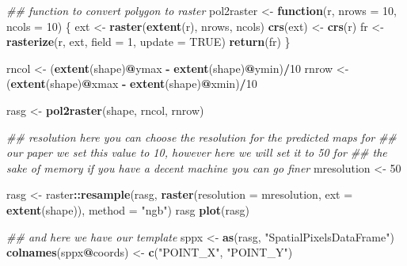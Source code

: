 \documentclass[]{book}
\newenvironment{Shaded}{\begin{snugshade}}{\end{snugshade}}
\newcommand{\CommentTok}[1]{\textcolor[rgb]{0.56,0.35,0.01}{\textit{#1}}}
\newcommand{\ControlFlowTok}[1]{\textcolor[rgb]{0.13,0.29,0.53}{\textbf{#1}}}
\newcommand{\DataTypeTok}[1]{\textcolor[rgb]{0.13,0.29,0.53}{#1}}
\newcommand{\DecValTok}[1]{\textcolor[rgb]{0.00,0.00,0.81}{#1}}
\newcommand{\KeywordTok}[1]{\textcolor[rgb]{0.13,0.29,0.53}{\textbf{#1}}}
\newcommand{\NormalTok}[1]{#1}
\newcommand{\OperatorTok}[1]{\textcolor[rgb]{0.81,0.36,0.00}{\textbf{#1}}}
\newcommand{\OtherTok}[1]{\textcolor[rgb]{0.56,0.35,0.01}{#1}}
\newcommand{\StringTok}[1]{\textcolor[rgb]{0.31,0.60,0.02}{#1}}
\begin{document}
\begin{Shaded}
\begin{Highlighting}[]
\CommentTok{## function to convert polygon to raster}
\NormalTok{pol2raster <-}\StringTok{ }\ControlFlowTok{function}\NormalTok{(r, }\DataTypeTok{nrows =} \DecValTok{10}\NormalTok{, }\DataTypeTok{ncols =} \DecValTok{10}\NormalTok{) \{}
\NormalTok{                    ext <-}\StringTok{ }\KeywordTok{raster}\NormalTok{(}\KeywordTok{extent}\NormalTok{(r), nrows, ncols)}
                    \KeywordTok{crs}\NormalTok{(ext) <-}\StringTok{ }\KeywordTok{crs}\NormalTok{(r)}
\NormalTok{                    fr <-}\StringTok{ }\KeywordTok{rasterize}\NormalTok{(r, ext, }\DataTypeTok{field =} \DecValTok{1}\NormalTok{, }\DataTypeTok{update =} \OtherTok{TRUE}\NormalTok{)}
                    \KeywordTok{return}\NormalTok{(fr)}
\NormalTok{\}}

\NormalTok{rncol <-}\StringTok{ }\NormalTok{(}\KeywordTok{extent}\NormalTok{(shape)}\OperatorTok{@}\NormalTok{ymax }\OperatorTok{-}\StringTok{ }\KeywordTok{extent}\NormalTok{(shape)}\OperatorTok{@}\NormalTok{ymin)}\OperatorTok{/}\DecValTok{10}
\NormalTok{rnrow <-}\StringTok{ }\NormalTok{(}\KeywordTok{extent}\NormalTok{(shape)}\OperatorTok{@}\NormalTok{xmax }\OperatorTok{-}\StringTok{ }\KeywordTok{extent}\NormalTok{(shape)}\OperatorTok{@}\NormalTok{xmin)}\OperatorTok{/}\DecValTok{10}

\NormalTok{rasg <-}\StringTok{ }\KeywordTok{pol2raster}\NormalTok{(shape, rncol, rnrow)}

\CommentTok{## resolution here you can choose the resolution for the predicted maps for}
\CommentTok{## our paper we set this value to 10, however here we will set it to 50 for}
\CommentTok{## the sake of memory if you have a decent machine you can go finer}
\NormalTok{mresolution <-}\StringTok{ }\DecValTok{50}

\NormalTok{rasg <-}\StringTok{ }\NormalTok{raster}\OperatorTok{::}\KeywordTok{resample}\NormalTok{(rasg, }\KeywordTok{raster}\NormalTok{(}\DataTypeTok{resolution =}\NormalTok{ mresolution, }\DataTypeTok{ext =} \KeywordTok{extent}\NormalTok{(shape)), }
                    \DataTypeTok{method =} \StringTok{"ngb"}\NormalTok{)}
\NormalTok{rasg}
\KeywordTok{plot}\NormalTok{(rasg)}

\CommentTok{## and here we have our template}
\NormalTok{sppx <-}\StringTok{ }\KeywordTok{as}\NormalTok{(rasg, }\StringTok{"SpatialPixelsDataFrame"}\NormalTok{)}
\KeywordTok{colnames}\NormalTok{(sppx}\OperatorTok{@}\NormalTok{coords) <-}\StringTok{ }\KeywordTok{c}\NormalTok{(}\StringTok{"POINT_X"}\NormalTok{, }\StringTok{"POINT_Y"}\NormalTok{)}
\end{Highlighting}
\end{Shaded}
\end{document}
